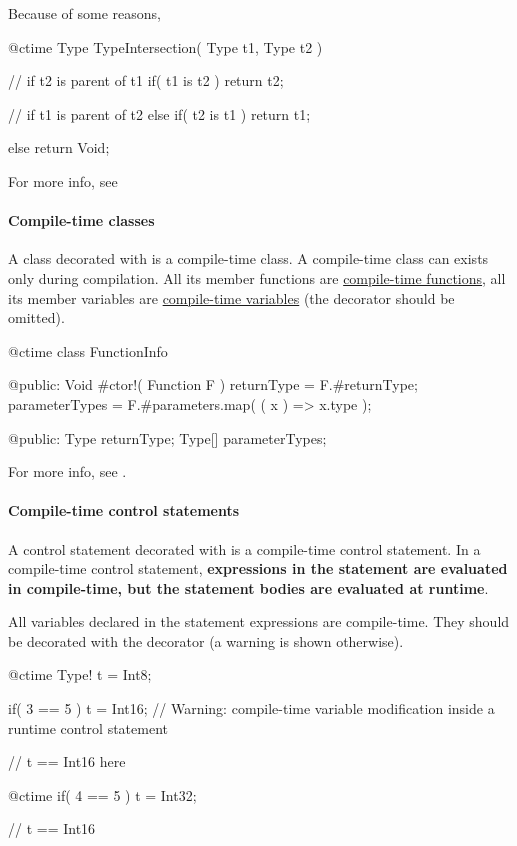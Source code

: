 Because of some reasons, 

\begin{code}
@ctime Type TypeIntersection( Type t1, Type t2 ) {
	// if t2 is parent of t1
	if( t1 is t2 )
		return t2;
		
	// if t1 is parent of t2
	else if( t2 is t1 )
		return t1;
	
	else
		return Void;
}
\end{code}

For more info, see 

\paragraph{Compile-time classes}
A class decorated with  is a compile-time class. A compile-time class can exists only during compilation. All its member functions are \hyperref[ctime:function]{compile-time functions}, all its member variables are \hyperref[ctime:variable]{compile-time variables} (the  decorator should be omitted).

\begin{code}
@ctime class FunctionInfo {

@public:
	Void #ctor!( Function F ) {
		returnType = F.#returnType;
		parameterTypes = F.#parameters.map( ( x ) => x.type );
	}
	
@public:
	Type returnType;
	Type[] parameterTypes;	
	
}
\end{code}

For more info, see .

\paragraph{Compile-time control statements}
A control statement decorated with  is a compile-time control statement. In a compile-time control statement, \textbf{expressions in the statement are evaluated in compile-time, but the statement bodies are evaluated at runtime}.

All variables declared in the statement expressions are compile-time. They should be decorated with the  decorator (a warning is shown otherwise).

\begin{code}
@ctime Type! t = Int8;

if( 3 == 5 )
	t = Int16; // Warning: compile-time variable modification inside a runtime control statement

// t == Int16 here

@ctime if( 4 == 5 )	
	t = Int32;
	
// t == Int16
\end{code}

